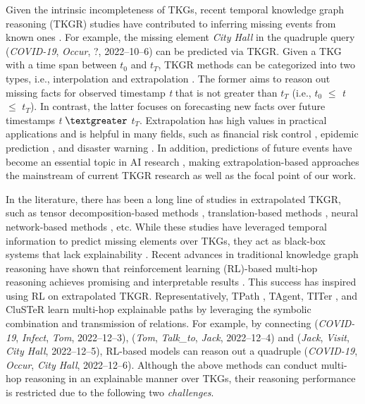 \documentclass[sigconf,natbib=true]{acmart}
\begin{document}
Given the intrinsic incompleteness of TKGs, recent temporal knowledge graph reasoning (TKGR) studies have contributed to inferring missing events from known ones \cite{kgr_survey}. For example, the missing element \emph{City Hall} in the quadruple query (\emph{COVID-19}, \emph{Occur}, ?, 2022--10--6) can be predicted via TKGR. Given a TKG with a time span between \emph{$t_0$} and \emph{$t_T$}, TKGR methods can be categorized into two types, i.e., interpolation and extrapolation \cite{RE-GCN, RE-NET}. The former aims to reason out missing facts for observed timestamp \emph{t} that is not greater than \emph{$t_T$} (i.e., \emph{$t_0$} $\leq$ \emph{t} $\leq$  \emph{$t_T$}). In contrast, the latter focuses on forecasting new facts over future timestamps \emph{t} $\textgreater$ \emph{$t_T$}. Extrapolation has high values in practical applications and is helpful in many fields, such as financial risk control \cite{financialapp}, epidemic prediction \cite{Cluster}, and disaster warning  \cite{disaster}. In addition, predictions of future events have become an essential topic in AI research \cite{AIwork, AI-research}, making extrapolation-based approaches the mainstream of current TKGR research \cite{tkgc-survey}  as well as the focal point of our work.

In the literature, there has been a long line of studies in extrapolated TKGR, such as tensor decomposition-based methods \cite{TNTComplEx, tensorc}, translation-based methods \cite{TTransE, TA-transE}, neural network-based methods \cite{RE-GCN, RE-NET, CyGNet}, etc. While these studies have leveraged temporal information to predict missing elements over TKGs, they act as black-box systems that lack explainability \cite{THML, RLH}. Recent advances in traditional knowledge graph reasoning have shown that reinforcement learning (RL)-based multi-hop reasoning achieves promising  and interpretable results \cite{kgsurvey, RS1}. This success has inspired using RL on extrapolated TKGR. Representatively, TPath \cite{TPath}, TAgent\cite{TAgent}, TITer \cite{TiTer}, and CluSTeR \cite{Cluster} learn multi-hop explainable paths by leveraging the symbolic combination and transmission of relations. For example, by connecting (\emph{COVID-19}, {\emph{Infect}}, \emph{Tom}, 2022--12--3),  (\emph{Tom},  \emph{Talk\_to},  \emph{Jack}, 2022--12--4) and (\emph{Jack}, \emph{Visit}, \emph{City Hall}, 2022--12--5), RL-based models can reason out a quadruple (\emph{COVID-19}, \emph{Occur}, \emph{City Hall}, 2022--12--6).  Although the above methods can conduct multi-hop reasoning in an explainable manner over TKGs, their reasoning performance is restricted due to the following two \emph{challenges}. 
\end{document}
